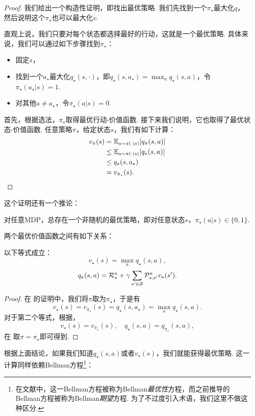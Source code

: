 \begin{proof}
我们给出一个构造性证明，即找出最优策略. 我们先找到一个$\pi_\star$最大化$q$，然后说明这个$\pi_\star$也可以最大化$v$. 

直观上说，我们只要对每个状态都选择最好的行动，这就是一个最优策略. 具体来说，我们可以通过如下步骤找到$\pi_\star$：
\begin{itemize}
    \item 固定$s$，
    \item 找到一个$a_\star$最大化$q_\star(s,\cdot)$，即$q_\star(s,a_\star)=\max_{a}q_\star(s,a)$，令$\pi_\star(a_\star|s)=1$.
    \item 对其他$a\neq a_\star$，令$\pi_\star(a|s)=0$.
\end{itemize}
首先，根据选法，$\pi_\star$取得最优行动-价值函数. 接下来我们说明，它也取得了最优状态-价值函数. 任意策略$\pi$，给定状态$s$，我们有如下计算：
\begin{align*}
    v_\pi(s) &= \mathbb{E}_{a\sim\pi(\cdot|s)}[q_\pi(s,a)]\\
             &\leq \mathbb{E}_{a\sim\pi(\cdot|s)}[q_\star(s,a)]\\
             &\leq q_\star(s,a_\star)\\
             &=v_{\pi_\star}(s).
\end{align*}
\end{proof}
这个证明还有一个推论：
\begin{corollary}
    对任意MDP，总存在一个非随机的最优策略，即对任意状态$s$，$\pi_\star(a|s)\in\{0,1\}$.
\end{corollary}

两个最优价值函数之间有如下关系：
\begin{proposition}\label{prop:state-action-value-optimal}
以下等式成立：
\[v_\star(s) = \max_a q_\star(s,a),\]
\[q_\star(s,a) = \mathcal R_s^a + \gamma \sum_{s'\in \mathcal S}\mathcal P_{s,s'}^av_\star(s').\]
\end{proposition}
\begin{proof}
    在 的证明中，我们将$\pi$取为$\pi_\star$，于是有
    \[v_\star(s) = v_{\pi_\star}(s) = q_{\star}(s,a_\star) = \max_a q_\star(s,a).\]
    对于第二个等式，根据，
    \[v_\star(s) = v_{\pi_\star}(s),\quad q_\star(s,a) = q_{\pi_\star}(s,a),\]
    在 取$\pi=\pi_\star$即可得到.
\end{proof}

根据上面结论，如果我们知道$q_\star(s,a)$或者$v_\star(s)$，我们就能获得最优策略. 这一计算同样依赖Bellman方程\footnote{在文献中，这一Bellman方程被称为Bellman\textit{最优性}方程，而之前推导的Bellman方程被称为Bellman\textit{期望}方程. 为了不过度引入术语，我们这里不做这种区分. }：

